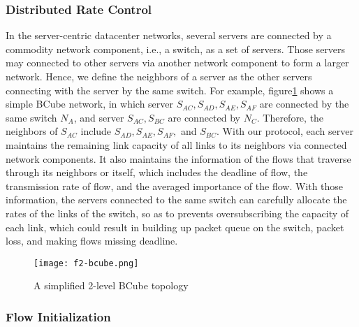 \documentclass[conference]{IEEEtran}
\begin{document}
\subsubsection{Distributed Rate Control}

In the server-centric datacenter networks, several servers are connected by a commodity network component, i.e., a switch, as a set of servers. Those servers may connected to other servers via another network component to form a larger network. Hence, we define the neighbors of a server as the other servers connecting with the server by the same switch. For example, figure\ref{fig:bcube} shows a simple BCube\cite{bcube} network, in which server $S_{AC}, S_{AD}, S_{AE}, S_{AF}$ are connected by the same switch $N_{A}$, and server $S_{AC}, S_{BC}$ are connected by $N_{C}$. Therefore, the neighbors of $S_{AC}$ include $S_{AD}, S_{AE}, S_{AF},$ and $S_{BC}$. With our protocol, each server maintains the remaining link capacity of all links to its neighbors via connected network components. It also maintains the information of the flows that traverse through its neighbors or itself, which includes the deadline of flow, the transmission rate of flow, and the averaged importance of the flow.
With those information, the servers connected to the same switch can carefully allocate the rates of the links of the switch, so as to prevents oversubscribing the capacity of each link, which could result in building up packet queue on the switch, packet loss, and making flows missing deadline.

\begin{figure}
  \centering
\texttt{[image: f2-bcube.png]}\\
  \caption{A simplified 2-level BCube topology}\label{fig:bcube}
\end{figure}

\subsubsection{Flow Initialization}
\end{document}
